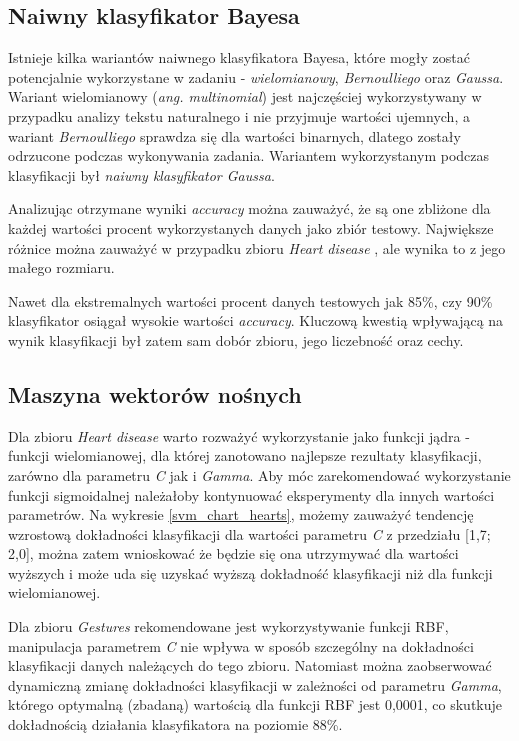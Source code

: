 \documentclass{classrep}
\begin{document}
{        \subsection{Naiwny klasyfikator Bayesa}
        \label{bayes_summary} {
            Istnieje kilka wariantów naiwnego klasyfikatora Bayesa, które mogły zostać potencjalnie wykorzystane w zadaniu - \textit{wielomianowy}, \textit{Bernoulliego} oraz \textit{Gaussa}.
            Wariant wielomianowy (\textit{ang. multinomial}) jest najczęściej wykorzystywany w przypadku analizy tekstu naturalnego i nie przyjmuje wartości ujemnych, a wariant \textit{Bernoulliego} sprawdza się dla wartości binarnych, dlatego zostały odrzucone podczas wykonywania zadania. Wariantem wykorzystanym podczas klasyfikacji był \textit{naiwny klasyfikator Gaussa}. 
            
            Analizując otrzymane wyniki \textit{accuracy} można zauważyć, że są one zbliżone dla każdej wartości procent wykorzystanych danych jako zbiór testowy. Największe różnice można zauważyć w przypadku zbioru \textit{Heart disease} \cite{dataset_heart}, ale wynika to z jego małego rozmiaru. 
            
            Nawet dla ekstremalnych wartości procent danych testowych jak 85\%, czy 90\% klasyfikator osiągał wysokie wartości \textit{accuracy}. Kluczową kwestią wpływającą na wynik klasyfikacji był zatem sam dobór zbioru, jego liczebność oraz cechy.
        }

        \subsection{Maszyna wektorów nośnych}
        \label{svm_summary} {
            Dla zbioru \textit{Heart disease} \cite{dataset_heart} warto rozważyć wykorzystanie jako funkcji jądra - funkcji wielomianowej, dla której zanotowano najlepsze rezultaty klasyfikacji, zarówno dla parametru \emph{C} jak i \emph{Gamma}. Aby móc zarekomendować wykorzystanie funkcji sigmoidalnej należałoby kontynuować eksperymenty dla innych wartości parametrów. Na wykresie \ref{svm_chart_hearts}, możemy zauważyć tendencję wzrostową dokładności klasyfikacji dla wartości parametru \emph{C} z przedziału [1,7; 2,0], można zatem wnioskować że będzie się ona utrzymywać dla wartości wyższych i może uda się uzyskać wyższą dokładność klasyfikacji niż dla funkcji wielomianowej.
            
            Dla zbioru \textit{Gestures} \cite{dataset_gestures} rekomendowane jest wykorzystywanie funkcji RBF, manipulacja parametrem \emph{C} nie wpływa w sposób szczególny na dokładności klasyfikacji danych należących do tego zbioru. Natomiast można zaobserwować dynamiczną zmianę dokładności klasyfikacji w zależności od parametru \emph{Gamma}, którego optymalną (zbadaną) wartością dla funkcji RBF jest 0,0001, co skutkuje dokładnością działania klasyfikatora na poziomie 88\%.
            
}}
\end{document}
